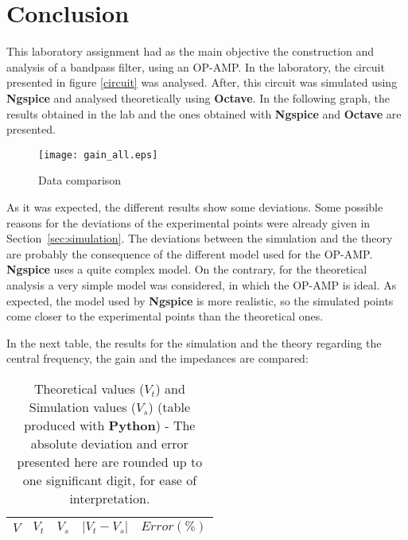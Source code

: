 \newpage

\section{Conclusion}
\label{sec:conclusion}

This laboratory assignment had as the main objective the construction and analysis of a bandpass filter, using an OP-AMP. In the laboratory, the circuit presented in figure \ref{circuit} was analysed. After, this circuit was simulated using {\bf Ngspice} and analysed theoretically using {\bf Octave}. In the following graph, the results obtained in the lab and the ones obtained with {\bf Ngspice} and {\bf Octave} are presented.

\begin{figure}[H]
        \centering
        \texttt{[image: gain\_all.eps]}
        \caption{Data comparison}
        \label{alldata}
\end{figure}

As it was expected, the different results show some deviations. Some possible reasons for the deviations of the experimental points were already given in Section~\ref{sec:simulation}. The deviations between the simulation and the theory are probably the consequence of the different model used for the OP-AMP. {\bf Ngspice} uses a quite complex model. On the contrary, for the theoretical analysis a very simple model was considered, in which the OP-AMP is ideal. As expected, the model used by {\bf Ngspice} is more realistic, so the simulated points come closer to the experimental points than the theoretical ones.

In the next table, the results for the simulation and the theory regarding the central frequency, the gain and the impedances are compared:

\begin{table}[H]
  \centering
  \begin{tabular}{|c|c|c|c|c|}
    \hline
        $V$ & $V_t$ & $V_s$ & $|V_t-V_s|$ & $Error (\%)$ \\
        \hline
        \hline
        
        \hline
  \end{tabular}
  \caption{Theoretical values ($V_t$) and Simulation values ($V_s$) (table produced with {\bf Python})  - The absolute deviation and error presented here are rounded up to one significant digit, for ease of interpretation.}
  \label{error1_res}
\end{table}

